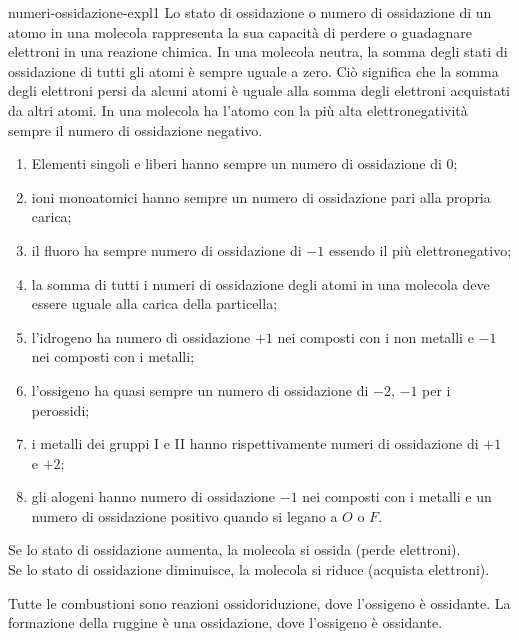 \documentclass[preview]{standalone}
\begin{document}
\begin{snippet}{numeri-ossidazione-expl1}
Lo stato di ossidazione o numero di ossidazione di un atomo in una molecola rappresenta la sua capacità di perdere o guadagnare
elettroni in una reazione chimica. In una molecola neutra, la somma degli stati di ossidazione di tutti gli atomi è
sempre uguale a zero. Ciò significa che la somma degli elettroni persi da alcuni atomi è uguale alla somma
degli elettroni acquistati da altri atomi. In una molecola ha l'atomo con la più alta elettronegatività
sempre il numero di ossidazione negativo.

\begin{enumerate}
    \item Elementi singoli e liberi hanno sempre un numero di ossidazione di \(0\);
    \item ioni monoatomici hanno sempre un numero di ossidazione pari alla propria carica;
    \item il fluoro ha sempre numero di ossidazione di \(-1\) essendo il più elettronegativo;
    \item la somma di tutti i numeri di ossidazione degli atomi in una molecola deve essere
        uguale alla carica della particella;
    \item l'idrogeno ha numero di ossidazione \(+1\) nei composti con i non metalli e \(-1\)
        nei composti con i metalli;
    \item l'ossigeno ha quasi sempre un numero di ossidazione di \(-2\), \(-1\) per i perossidi;
    \item i metalli dei gruppi I e II hanno rispettivamente numeri di ossidazione di \(+1\) e \(+2\);
    \item gli alogeni hanno numero di ossidazione \(-1\) nei composti con i metalli e un numero di ossidazione
        positivo quando si legano a \(O\) o \(F\).
\end{enumerate}


Se lo stato di ossidazione aumenta, la molecola si ossida (perde elettroni). \\
Se lo stato di ossidazione diminuisce, la molecola si riduce (acquista elettroni).

Tutte le combustioni sono reazioni ossidoriduzione, dove l'ossigeno è ossidante.
La formazione della ruggine è una ossidazione, dove l'ossigeno è ossidante.
\end{snippet}
\end{document}
